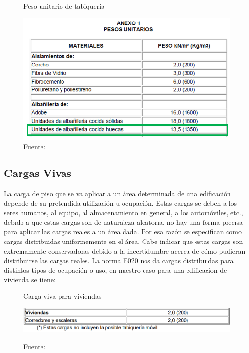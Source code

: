 \documentclass[12pt]{article}
\begin{document}
\begin{figure}[h!]
    \centering
    \caption{Peso unitario de tabiquería}
    \includegraphics[scale=0.7]{IMAGENES/3.PNG}
    \caption*{\small Fuente: \it \cite{E-020}}
    \label{fig:my_label}
\end{figure}

\newpage

\subsection{Cargas Vivas}
La carga de piso que se va aplicar a un área determinada de una edificación depende de su pretendida utilización u ocupación. Estas cargas se deben a los seres humanos, al equipo, al almacenamiento en general, a los automóviles, etc., debido a que estas cargas son de naturaleza aleatoria, no hay una forma precisa para aplicar las cargas reales a un área dada. Por esa razón se especifican como cargas distribuidas uniformemente en el área. Cabe indicar que estas cargas son extremamente conservadoras debido a la incertidumbre acerca de cómo pudieran distribuirse las cargas reales. La norma E020 nos da cargas distribuidas para distintos tipos de ocupación o uso, en nuestro caso para una edificacion de vivienda se tiene:  

\begin{figure}[h]
    \centering
    \caption{Carga viva para viviendas}
    \includegraphics[scale=0.8]{IMAGENES/4.PNG}
    \label{fig:my_label}
    \caption*{\small Fuente: \it \cite{E-020}}
\end{figure}
\end{document}
